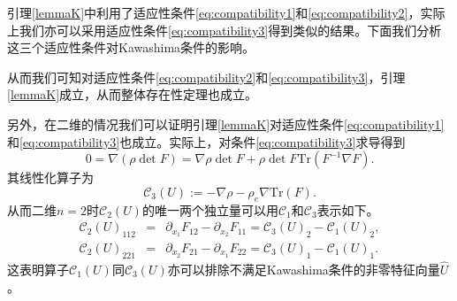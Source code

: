 \begin{remark}
引理\ref{lemmaK}中利用了适应性条件\eqref{eq:compatibility1}和\eqref{eq:compatibility2}，实际上我们亦可以采用适应性条件\eqref{eq:compatibility3}得到类似的结果。下面我们分析这三个适应性条件对Kawashima条件的影响。

从而我们可知对适应性条件\eqref{eq:compatibility2}和\eqref{eq:compatibility3}，引理\ref{lemmaK}成立，从而整体存在性定理也成立。

另外，在二维的情况我们可以证明引理\ref{lemmaK}对适应性条件\eqref{eq:compatibility1}和\eqref{eq:compatibility3}也成立。实际上，对条件\eqref{eq:compatibility3}求导得到
$$
0=\nabla (\rho \det F) = \nabla \rho \det F + \rho \det F \mbox{Tr}(F^{-1} \nabla F).
$$
其线性化算子为
\begin{equation*} \label{3}
\mathcal{C}_3(U):=-\nabla \rho - \rho_e \nabla \mbox{Tr}(F).
\end{equation*}
从而二维$n=2$时$\mathcal{C}_2(U)$的唯一两个独立量可以用$\mathcal{C}_1$和$\mathcal{C}_3$表示如下。
\begin{eqnarray*}
\mathcal{C}_2(U)_{112}&=&\partial_{x_1}F_{12} - \partial_{x_2}F_{11}= {\mathcal{C}_3(U)}_2 - {\mathcal{C}_1(U)}_2, \\ \mathcal{C}_2(U)_{221}&=&\partial_{x_2}F_{21}-\partial_{x_1}F_{22} = {\mathcal{C}_3(U)}_1 - {\mathcal{C}_1(U)}_1.
\end{eqnarray*}
这表明算子${\mathcal C}_1(U)$同${\mathcal C}_3(U)$亦可以排除不满足Kawashima条件的非零特征向量$\hat{U}$。


\end{remark}
